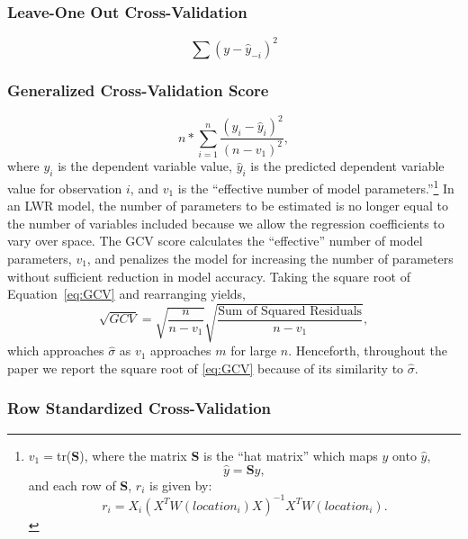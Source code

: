\documentclass{article}\usepackage{graphicx, color}
\begin{document}
\subsubsection{Leave-One Out Cross-Validation}

\begin{equation}
\sum (y - \hat{y}_{-i})^2
\end{equation}

\subsubsection{Generalized Cross-Validation Score}
\begin{equation}\label{eq:GCV}
  n*\sum_{i=1}^{n}\frac{(y_i-\hat{y}_i)^2}{(n-v_1)^2}, 
  \end{equation}
where $y_i$ is the dependent variable value, $\hat{y}_i$ is the predicted dependent variable value for observation $i$, and $v_1$ is the ``effective number of model parameters.''\footnote{
  $v_1=$tr(\textbf{S}), where the matrix \textbf{S} is the ``hat matrix'' which maps $y$ onto $\hat{y}$,
\begin{equation*}
  \hat{y}=\textbf{S}y,
  \end{equation*}
  and each row of \textbf{S}, $r_i$ is given by:
  \begin{equation*}
    r_i=X_i(X^TW(location_i)X)^{-1}X^TW(location_i).
    \end{equation*}
}
In an LWR model, the number of parameters to be estimated is no longer equal to the number of variables included because we allow the regression coefficients to vary over space. The GCV score calculates the ``effective'' number of model parameters, $v_1$, and penalizes the model for increasing the number of parameters without sufficient reduction in model accuracy. Taking the square root of Equation~\eqref{eq:GCV} and rearranging yields,
\begin{equation}
  \sqrt{GCV}=\sqrt{\frac{n}{n-v_1}} \sqrt{\frac{\textrm{Sum of Squared Residuals}}{n-v_1}},
\end{equation}
which approaches $\hat{\sigma}$ as $v_1$ approaches $m$ for large $n$. Henceforth, throughout the paper we report the square root of \eqref{eq:GCV} because of its similarity to $\hat{\sigma}$.  

\subsubsection{Row Standardized Cross-Validation}
\end{document}
